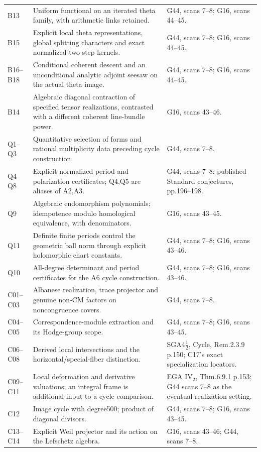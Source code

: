\begin{longtable}{@{}p{.18\linewidth}p{.48\linewidth}p{.27\linewidth}@{}}
B13 & Uniform functional on an iterated theta family, with arithmetic links retained. & G44, scans 7--8; G16, scans 44--45.\\
B15 & Explicit local theta representations, global splitting characters and exact normalized two-step kernels. & G44, scans 7--8; G16, scans 44--45.\\
B16--B18 & Conditional coherent descent and an unconditional analytic adjoint seesaw on the actual theta image. & G44, scans 7--8; G16, scans 44--45.\\
B14 & Algebraic diagonal contraction of specified tensor realizations, contrasted with a different coherent line-bundle power. & G16, scans 43--46.\\
Q1--Q3 & Quantitative selection of forms and rational multiplicity data preceding cycle construction. & G44, scans 7--8.\\
Q4--Q8 & Explicit normalized period and polarization certificates; Q4,Q5 are aliases of A2,A3. & G44, scans 7--8; published Standard conjectures, pp.196--198.\\
Q9 & Algebraic endomorphism polynomials; idempotence modulo homological equivalence, with denominators. & G16, scans 43--45.\\
Q11 & Definite finite periods control the geometric ball norm through explicit holomorphic chart constants. & G44, scans 7--8; G16, scans 43--46.\\
Q10 & All-degree determinant and period certificates for the A6 cycle construction. & G44, scans 7--8; G16, scans 43--46.\\
C01--C03 & Albanese realization, trace projector and genuine non-CM factors on noncongruence covers. & G44, scans 7--8.\\
C04--C05 & Correspondence-module extraction and its Hodge-group scope. & G44, scans 7--8; G16, scans 43--45.\\
C06--C08 & Derived local intersections and the horizontal/special-fiber distinction. & SGA4$\frac12$, Cycle, Rem.2.3.9 p.150; C17's exact specialization locators.\\
C09--C11 & Local deformation and derivative valuations; an integral frame is additional input to a cycle comparison. & EGA IV$_2$, Thm.6.9.1 p.153; G44 scans 7--8 as the eventual realization setting.\\
C12 & Image cycle with degree500; product of diagonal divisors. & G44, scans 7--8; G16, scans 43--45.\\
C13--C14 & Explicit Weil projector and its action on the Lefschetz algebra. & G16, scans 43--46; G44, scans 7--8.\\

\end{longtable}
